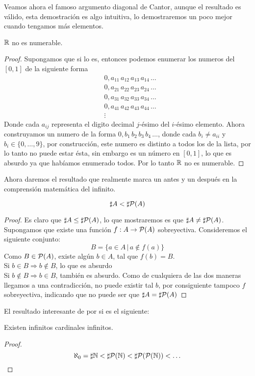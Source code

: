 \documentclass[12pt,a4paper]{book}
\begin{document}
Veamos ahora el famoso argumento diagonal de Cantor, aunque el resultado es válido, esta demostración es algo intuitiva, lo demostraremos un poco mejor cuando tengamos más elementos.
\begin{teo}[Cantor]
$\R$ no es numerable.
\begin{proof}
Supongamos que si lo es, entonces podemos enumerar los numeros del $[0,1]$ de la siguiente forma
\begin{align*}
&0,a_{11} \, a_{12} \, a_{13} \, a_{14} \, \ldots \\
&0,a_{21} \, a_{22} \, a_{23} \, a_{24} \, \ldots \\
&0,a_{31} \, a_{32} \, a_{33} \, a_{34} \, \ldots \\
&0,a_{41} \, a_{42} \, a_{43} \, a_{44} \, \ldots \\
&\vdots   
\end{align*}
Donde cada $a_{ij}$ representa el digito decimal $j$-ésimo del $i$-ésimo elemento.
Ahora construyamos un numero de la forma $0,b_{1} \, b_{2} \, b_{3} \, b_{4} \, \ldots$, donde cada $b_i \neq a_{ii}$ y $b_i \in \{0, \ldots, 9\}$, por construcción, este numero es distinto a todos los de la lista, por lo tanto no puede estar ésta, sin embargo es un número en $[0,1]$, lo que es absurdo ya que habíamos enumerado todos. Por lo tanto $\R$ no es numerable.
\end{proof}
\end{teo}
Ahora daremos el resultado que realmente marca un antes y un después en la comprensión matemática del infinito.
\begin{teo}
$$\sharp A < \sharp \P(A) $$
\begin{proof}
Es claro que $\sharp A \leq \sharp \P(A) $, lo que mostraremos es que $\sharp A \neq \sharp \P(A)$. Supongamos que existe una función $f: A \rightarrow \P(A)$ sobreyectiva. Consideremos el siguiente conjunto:
$$ B = \{ a \in A \,\vert\, a \notin f(a) \}$$
Como $B \in \P(A)$, existe algún $b \in A$, tal que $f(b) = B$.\\
Si $b \in B \Rightarrow b\notin B$, lo que es absurdo\\
Si $b \notin B \Rightarrow b\in B$, también es absurdo. Como de cualquiera de las dos maneras llegamos a una contradicción, no puede existir tal $b$, por consiguiente tampoco $f$ sobreyectiva, indicando que no puede ser que $ \sharp A = \sharp \P(A)$
\end{proof}
\end{teo}
El resultado interesante de por si es el siguiente:
\begin{cor}
Existen infinitos cardinales infinitos.
\begin{proof}
$$ \aleph_0 = \sharp\N < \sharp \P(\N) < \sharp \P(\P(\N)) < \ldots$$
\end{proof}
\end{cor}
\end{document}
